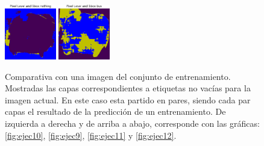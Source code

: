 \begin{figure}[h!tpb]
  \vrule
  \includegraphics[width=0.2\textwidth]{../../modelos-entrenados/unet-conv/ejecucion12/predtrainmid0}
  \vrule
  \includegraphics[width=0.2\textwidth]{../../modelos-entrenados/unet-conv/ejecucion12/predtrainmid6}
  \caption{Comparativa con una imagen del conjunto de entrenamiento. Mostradas las capas correspondientes a etiquetas no vacías para la imagen actual. En este caso esta partido en pares, siendo cada par capas el resultado de la predicción de un entrenamiento. De izquierda a derecha y de arriba a abajo, corresponde con las gráficas: \autoref{fig:ejec10}, \autoref{fig:ejec9}, \autoref{fig:ejec11} y \autoref{fig:ejec12}.}
  \label{fig:comparativa1-train}
\end{figure}

